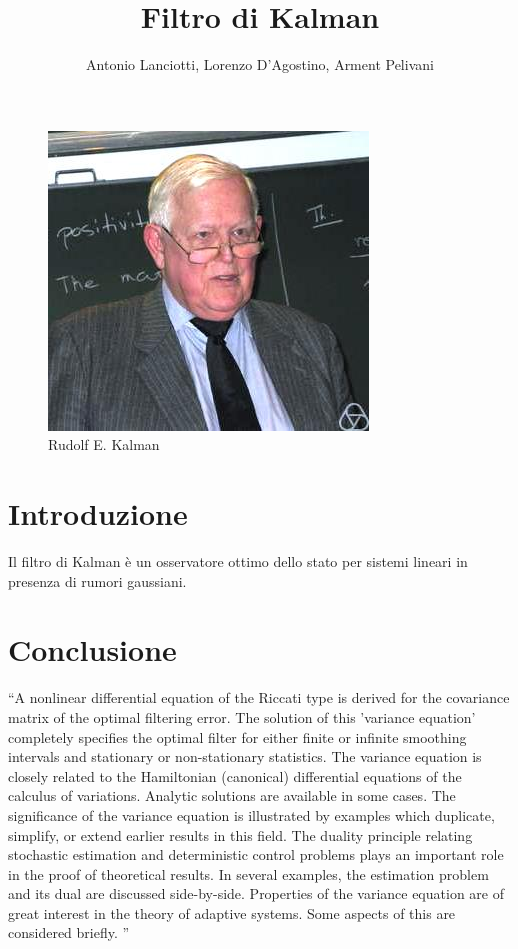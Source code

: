 \documentclass{article}
\title{Filtro di Kalman}
\author{Antonio Lanciotti, Lorenzo D'Agostino, Arment Pelivani}
\begin{document}
\maketitle

\begin{figure}[ht]
\centering
\includegraphics[scale=1]{Rudolf_Kalman.jpg} 
\caption{Rudolf E. Kalman}
\label{fig:kalman}
\end{figure}

\newpage

\tableofcontents

\newpage



\section{Introduzione}
Il filtro di Kalman è un osservatore ottimo dello stato per sistemi lineari in presenza di rumori gaussiani.

\newpage



\newpage



\newpage



\section{Conclusione}
``A nonlinear differential equation of the Riccati type is derived for the covariance matrix of the optimal filtering error. The solution of this 'variance equation' completely specifies the optimal filter for either finite or infinite smoothing intervals and stationary or non-stationary statistics.
The variance equation is closely related to the Hamiltonian (canonical) differential equations of the calculus of variations. Analytic solutions are available in some cases. The significance of the variance equation is illustrated by examples which duplicate, simplify, or extend earlier results in this field.
The duality principle relating stochastic estimation and deterministic control problems plays an important role in the proof of theoretical results. In several examples, the estimation problem and its dual are discussed side-by-side.
Properties of the variance equation are of great interest in the theory of adaptive systems. Some aspects of this are considered briefly. '' \citep{kalmanbucy}



\end{document}
